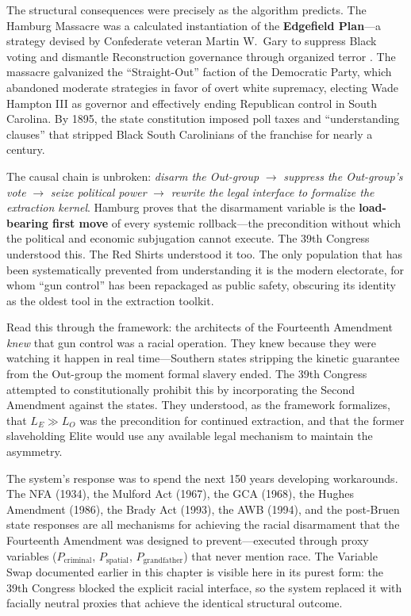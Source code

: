 The structural consequences were precisely as the algorithm predicts. The Hamburg Massacre was a calculated instantiation of the \textbf{Edgefield Plan}---a strategy devised by Confederate veteran Martin W.\ Gary to suppress Black voting and dismantle Reconstruction governance through organized terror \cite{hamburg_zinn}. The massacre galvanized the ``Straight-Out'' faction of the Democratic Party, which abandoned moderate strategies in favor of overt white supremacy, electing Wade Hampton III as governor and effectively ending Republican control in South Carolina. By 1895, the state constitution imposed poll taxes and ``understanding clauses'' that stripped Black South Carolinians of the franchise for nearly a century.

The causal chain is unbroken: \textit{disarm the Out-group} $\rightarrow$ \textit{suppress the Out-group's vote} $\rightarrow$ \textit{seize political power} $\rightarrow$ \textit{rewrite the legal interface to formalize the extraction kernel}. Hamburg proves that the disarmament variable is the \textbf{load-bearing first move} of every systemic rollback---the precondition without which the political and economic subjugation cannot execute. The 39th Congress understood this. The Red Shirts understood it too. The only population that has been systematically prevented from understanding it is the modern electorate, for whom ``gun control'' has been repackaged as public safety, obscuring its identity as the oldest tool in the extraction toolkit.

\medskip

Read this through the framework: the architects of the Fourteenth Amendment \textit{knew} that gun control was a racial operation. They knew because they were watching it happen in real time---Southern states stripping the kinetic guarantee from the Out-group the moment formal slavery ended. The 39th Congress attempted to constitutionally prohibit this by incorporating the Second Amendment against the states. They understood, as the framework formalizes, that $L_E \gg L_O$ was the precondition for continued extraction, and that the former slaveholding Elite would use any available legal mechanism to maintain the asymmetry.

The system's response was to spend the next 150 years developing workarounds. The NFA (1934), the Mulford Act (1967), the GCA (1968), the Hughes Amendment (1986), the Brady Act (1993), the AWB (1994), and the post-Bruen state responses are all mechanisms for achieving the racial disarmament that the Fourteenth Amendment was designed to prevent---executed through proxy variables ($P_{\text{criminal}}$, $P_{\text{spatial}}$, $P_{\text{grandfather}}$) that never mention race. The Variable Swap documented earlier in this chapter is visible here in its purest form: the 39th Congress blocked the explicit racial interface, so the system replaced it with facially neutral proxies that achieve the identical structural outcome.

